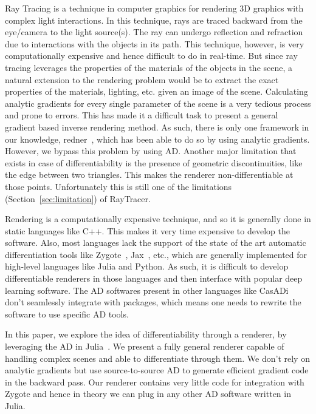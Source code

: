 \documentclass{juliacon}
\begin{document}
Ray Tracing is a technique in computer graphics for rendering 3D graphics with complex light interactions. In this technique, rays are traced backward from the eye/camera to the light source(s). The ray can undergo reflection and refraction due to interactions with the objects in its path. This technique, however, is very computationally expensive and hence difficult to do in real-time. But since ray tracing leverages the properties of the materials of the objects in the scene, a natural extension to the rendering problem would be to extract the exact properties of the materials, lighting, etc. given an image of the scene. Calculating analytic gradients for every single parameter of the scene is a very tedious process and prone to errors. This has made it a difficult task to present a general gradient based inverse rendering method. As such, there is only one framework in our knowledge, redner~\cite{Li:2018:DMC}, which has been able to do so by using analytic gradients. However, we bypass this problem by using AD. Another major limitation that exists in case of differentiability is the presence of geometric discontinuities, like the edge between two triangles. This makes the renderer non-differentiable at those points. Unfortunately this is still one of the limitations (Section~\ref{sec:limitation}) of RayTracer.

Rendering is a computationally expensive technique, and so it is generally done in static languages like C++. This makes it very time expensive to develop the software. Also, most languages lack the support of the state of the art automatic differentiation tools like Zygote~\cite{DBLP:journals/corr/abs-1810-07951}, Jax~\cite{jax}, etc., which are generally implemented for high-level languages like Julia and Python. As such, it is difficult to develop differentiable renderers in those languages and then interface with popular deep learning software. The AD softwares present in other languages like CasADi~\cite{casadi} don't seamlessly integrate with packages, which means one needs to rewrite the software to use specific AD tools.

In this paper, we explore the idea of differentiability through a renderer, by leveraging the AD in Julia~\cite{bezanson2017julia}. We present a fully general renderer capable of handling complex scenes and able to differentiate through them. We don't rely on analytic gradients but use source-to-source AD to generate efficient gradient code in the backward pass. Our renderer contains very little code for integration with Zygote and hence in theory we can plug in any other AD software written in Julia.
                                                                                                                              
\end{document}
